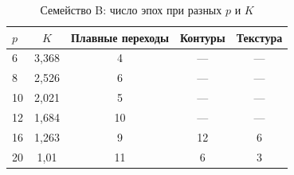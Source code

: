 \begin{table}[H]
\centering
\caption{Семейство B: число эпох при разных $p$ и $K$}
\label{tab:family-b}
\begin{tabular}{@{}lcccc@{}}
\hline
$p$ & $K$ & Плавные переходы & Контуры & Текстура \\
\hline
6 & 3{,}368 & 4 & --- & --- \\
8 & 2{,}526 & 6 & --- & --- \\
10 & 2{,}021 & 5 & --- & --- \\
12 & 1{,}684 & 10 & --- & --- \\
16 & 1{,}263 & 9 & 12 & 6 \\
20 & 1{,}01 & 11 & 6 & 3 \\
\hline
\end{tabular}
\end{table}
